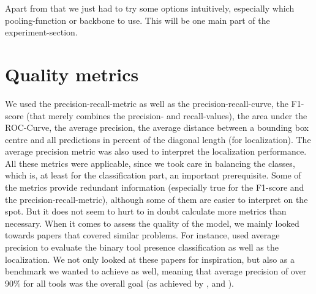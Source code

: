 Apart from that we just had to try some options intuitively, especially which pooling-function or backbone to use. This will be one main part of the experiment-section.

\section{Quality metrics}

We used the precision-recall-metric as well as the precision-recall-curve, the F1-score (that merely combines the precision- and recall-values), the area under the ROC-Curve, the average precision, the average distance between a bounding box centre and all predictions in percent of the diagonal length (for localization). The average precision metric was also used to interpret the localization performance. All these metrics were applicable, since we took care in balancing the classes, which is, at least for the classification part, an important prerequisite. Some of the metrics provide redundant information (especially true for the F1-score and the precision-recall-metric), although some of them are easier to interpret on the spot. But it does not seem to hurt to in doubt calculate more metrics than necessary.
When it comes to assess the quality of the model, we mainly looked towards papers that covered similar problems. For instance, \cite{Vardazaryan} used average precision to evaluate the binary tool presence classification as well as the localization. We not only looked at these papers for inspiration, but also as a benchmark we wanted to achieve as well, meaning that average precision of over 90\% for all tools was the overall goal (as achieved by \cite{Vardazaryan}, \cite{endonet} and \cite{lstm}).

